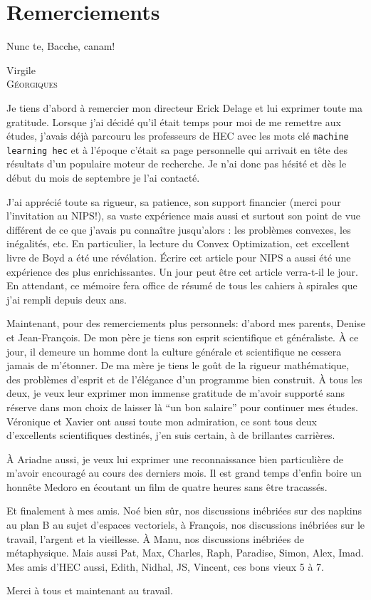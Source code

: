 \section*{Remerciements}

\epigraph{Nunc te, Bacche, canam!}{Virgile\\\textsc{Géorgiques}}

Je tiens d'abord à remercier mon directeur Erick Delage et lui exprimer toute ma
gratitude. Lorsque j'ai décidé qu'il était temps pour moi de me remettre aux études,
j'avais déjà parcouru les professeurs de HEC avec les mots clé
{\small\verb+machine learning hec+} et à l'époque c'était sa page personnelle qui arrivait
en tête des résultats d'un populaire moteur de recherche. Je n'ai donc pas hésité et dès
le début du mois de septembre je l'ai contacté.

J'ai apprécié toute sa rigueur, sa patience, son support financier (merci pour
l'invitation au NIPS!), sa vaste expérience mais aussi et surtout son point de vue
différent de ce que j'avais pu connaître jusqu'alors : les problèmes convexes, les
inégalités, etc. En particulier, la lecture du Convex Optimization, cet excellent livre de
Boyd a été une révélation. Écrire cet article pour NIPS a aussi été une expérience des
plus enrichissantes. Un jour peut être cet article verra-t-il le jour. En attendant, ce
mémoire fera office de résumé de tous les cahiers à spirales que j'ai rempli depuis deux
ans.

Maintenant, pour des remerciements plus personnels: d'abord mes parents, Denise et
Jean-François. De mon père je tiens son esprit scientifique et généraliste. À ce jour, il
demeure un homme dont la culture générale et scientifique ne cessera jamais de
m'étonner. De ma mère je tiens le goût de la rigueur mathématique, des problèmes d'esprit
et de l'élégance d'un programme bien construit. À tous les deux, je veux leur exprimer mon
immense gratitude de m'avoir supporté sans réserve dans mon choix de laisser là ``un bon
salaire'' pour continuer mes études. Véronique et Xavier ont aussi toute mon admiration,
ce sont tous deux d'excellents scientifiques destinés, j'en suis certain, à de brillantes
carrières.

À Ariadne aussi, je veux lui exprimer une reconnaissance bien particulière de m'avoir
encouragé au cours des derniers mois. Il est grand temps d'enfin boire un honnête Medoro
en écoutant un film de quatre heures sans être tracassés.

Et finalement à mes amis. Noé bien sûr, nos discussions inébriées sur des napkins au plan
B au sujet d'espaces vectoriels, à François, nos discussions inébriées sur le travail,
l'argent et la vieillesse. À Manu, nos discussions inébriées de métaphysique. Mais aussi
Pat, Max, Charles, Raph, Paradise, Simon, Alex, Imad. Mes amis d'HEC aussi, Edith, Nidhal,
JS, Vincent, ces bons vieux 5 à 7.

Merci à tous et maintenant au travail. 


